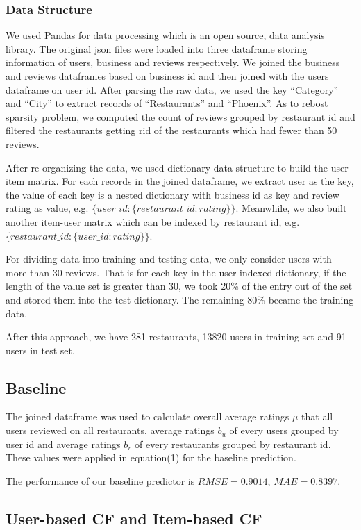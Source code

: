 \documentclass{llncs}
\begin{document}
\subsubsection{Data Structure}
We used Pandas for data processing which is an open source, data analysis library. The original json files were loaded into three dataframe storing information of users, business and reviews respectively. We joined the business and reviews dataframes based on business id and then joined with the users dataframe on user id. After parsing the raw data, we used the key “Category” and “City” to extract records of “Restaurants” and “Phoenix”. As to rebost sparsity problem, we computed the count of reviews grouped by restaurant id and filtered the restaurants getting rid of the restaurants which had fewer than 50 reviews. 

After re-organizing the data, we used dictionary data structure to build the user-item matrix. For each records in the joined dataframe, we extract user as the key, the value of each key is a nested dictionary with business id as key and review rating as value, e.g. $\{user\_id: \{restaurant\_id: rating\}\}$. Meanwhile, we also built another item-user matrix which can be indexed by restaurant id, e.g. $\{restaurant\_id: \{user\_id: rating\}\}$.

For dividing data into training and testing data, we only consider users with more than 30 reviews. That is for each key in the user-indexed dictionary, if the length of the value set is greater than 30, we took 20\% of the entry out of the set and stored them into the test dictionary. The remaining 80\% became the training data. 

After this approach, we have 281 restaurants, 13820 users in training set and 91 users in test set.
\subsection{Baseline}
The joined dataframe was used to calculate overall average ratings $\mu$ that all users reviewed on all restaurants, average ratings $b_u$ of every users grouped by user id and average ratings $b_r$ of every restaurants grouped by restaurant id. These values were applied in equation(1) for the baseline prediction.

The performance of our baseline predictor is $RMSE = 0.9014 $, $MAE= 0.8397$.
\subsection{User-based CF and Item-based CF}
\end{document}
